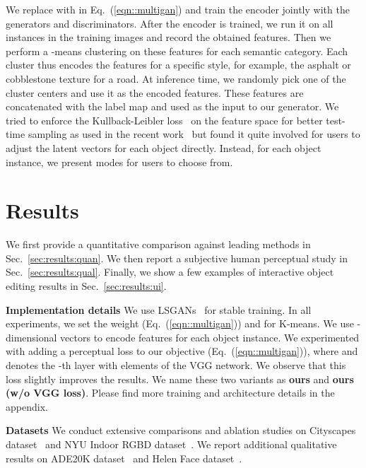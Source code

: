 \documentclass[10pt,twocolumn,letterpaper]{article}
\newcommand{\refsec}[1]{Sec.~\ref{sec:#1}}
\newcommand{\lblsec}[1]{\label{sec:#1}}
\newcommand{\ours}{ours\xspace}
\begin{document}
We replace  with  in Eq.~(\ref{eqn::multigan}) and train the encoder jointly with the generators and discriminators. After the encoder is trained, we run it on all instances in the training images and record the obtained features. Then we perform a -means clustering on these features for each semantic category.
Each cluster thus encodes the features for a specific style, for example, the asphalt or cobblestone texture for a road.
At inference time, we randomly pick one of the cluster centers and use it as the encoded features. These features are concatenated with the label map and used as the input to our generator. We tried to enforce the Kullback-Leibler loss~\cite{kingma2013auto} on the feature space for better test-time sampling as used in the recent work~\cite{zhu2017toward} but found it quite involved for users to adjust the latent vectors for each object directly. Instead, for each object instance, we  present  modes for users to choose from.
 
\section{Results} \lblsec{results}

We first provide a quantitative comparison against leading methods in \refsec{results:quan}. We then report a subjective human perceptual study in \refsec{results:qual}. Finally, we show a few examples of interactive object editing results in \refsec{results:ui}. 

\vspace{.03in}
{\noindent \bf Implementation details}
We use LSGANs~\cite{mao2017least} for stable training. In all experiments, we set the weight  (Eq.~(\ref{eqn::multigan})) and  for K-means. We use -dimensional vectors to encode features for each object instance. We experimented with adding a perceptual loss  to our objective (Eq.~(\ref{eqn::multigan})), where  and  denotes the -th layer with   elements of the VGG network. We observe that this loss slightly improves the results. We name these two variants as \textbf{\ours} and \textbf{ours (w/o VGG loss)}. Please find more training and architecture details in the appendix.

\vspace{.03in}
{\noindent \bf Datasets} We conduct extensive comparisons and ablation studies on Cityscapes dataset~\cite{Cordts2016cityscapes} and NYU Indoor RGBD dataset~\cite{Silberman2012indoor}. We report additional qualitative results on ADE20K dataset~\cite{zhou2017scene} and Helen Face dataset~\cite{le2012interactive,smith2013exemplar}.
\end{document}
